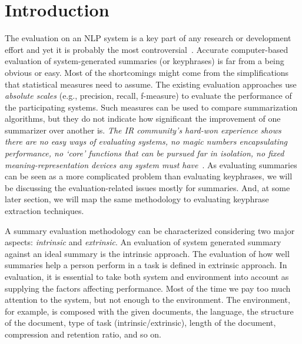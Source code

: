 \documentclass[a4paper]{report}
\begin{document}
\section{Introduction}
The evaluation on an NLP system is a key part of any research or development effort and yet it is probably the most controversial~\cite{Jing98summarizationevaluation}. Accurate computer-based evaluation of system-generated summaries (or keyphrases) is far from a being obvious or easy. Most of the shortcomings might come from the simplifications that statistical measures need to assume. The existing evaluation approaches use \emph{absolute scales} (e.g., precision, recall, f-measure) to evaluate the performance of the participating systems. Such measures can be used to compare summarization algorithms, but they do not indicate how significant the improvement of one summarizer over another is. \emph{The IR community's hard-won experience shows there are no easy ways of evaluating systems, no magic numbers encapsulating performance, no `core' functions that can be pursued far in isolation, no fixed meaning-representation devices any system must have}~\cite{H94-1018}. As evaluating summaries can be seen as a more complicated problem than evaluating keyphrases, we will be discussing the evaluation-related issues mostly for summaries. And, at some later section, we will map the same methodology to evaluating keyphrase extraction techniques. \\

\par A summary evaluation methodology can be characterized considering two major aspects: \emph{intrinsic} and \emph{extrinsic}. An evaluation of system generated summary against an ideal summary is the intrinsic approach. The evaluation of how well summaries help a person perform in a task is defined in extrinsic approach. In evaluation, it is essential to take both system and environment into account as supplying the factors affecting performance. Most of the time we pay too much attention to the system, but not enough to the environment. The environment, for example, is composed with the given documents, the language, the structure of the document, type of task (intrinsic/extrinsic), length of the document, compression and retention ratio, and so on. \\
\end{document}
